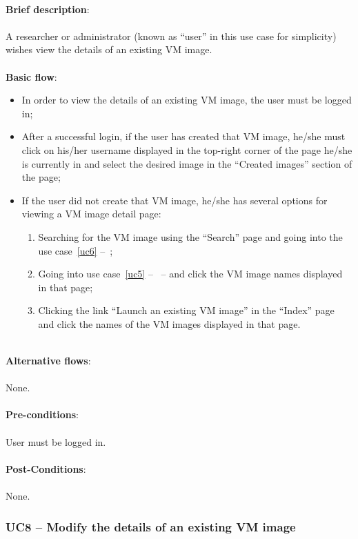 \ \\
\textbf{Brief description}:\\
\ \\
A researcher or administrator (known as ``user'' in this use case for simplicity) wishes view the details of an existing VM image.\\
\ \\
\textbf{Basic flow}:

\begin{itemize}
\item In order to view the details of an existing VM image, the user must be logged in;
\item After a successful login,  if the user has created that VM image, he/she must click on his/her username displayed in the top-right corner of the page he/she is currently in and select the desired image in the ``Created images'' section of the page;
\item If the user did not create that VM image, he/she has several options for viewing a VM image detail page:
	\begin{enumerate}
	\item Searching for the VM image using the ``Search'' page and going into the use case~\ref{uc6} --~;
	\item Going into use case~\ref{uc5} --~ -- and click the VM image names displayed in that page;
	\item Clicking the link ``Launch an existing VM image'' in the ``Index'' page and click the names of the VM images displayed in that page.
	\end{enumerate}
\end{itemize}

\ \\
\textbf{Alternative flows}:\\
\ \\
None.\\
\ \\
\textbf{Pre-conditions}:\\
\ \\
User must be logged in.\\
\ \\
\textbf{Post-Conditions}:\\
\ \\
None.

\subsubsection{UC8 -- Modify the details of an existing VM image}\label{uc8}

